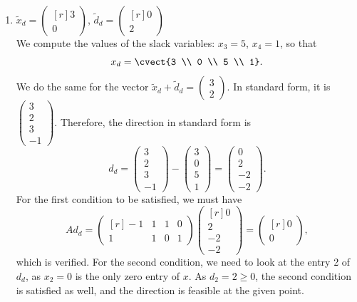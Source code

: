 \begin{enumerate}
%
%
        \item $\tilde{x}_d = \begin{pmatrix*}[r] 3 \\ 0 \end{pmatrix*}$, $\tilde{d}_d = \begin{pmatrix*}[r] 0 \\ 2 \end{pmatrix*}$ \\
        We compute the values of the slack variables: $x_3 = 5$, $x_4
        = 1$, so that
        \[
         {x}_d = \cvect{3 \\ 0 \\ 5 \\ 1}.
         \]
         We do the same for the vector $\tilde{x}_d+\tilde{d}_d =\left(\begin{array}{r} 3\\ 2 \end{array}\right)$.
         In standard form, it is $\left(\begin{array}{r} 3\\ 2 \\ 3 \\ -1 \end{array}\right)$.
         Therefore, the direction in standard form is
         \[d_d=\left(\begin{array}{r} 3\\ 2 \\ 3 \\ -1 \end{array}\right)-
         \left(\begin{array}{r} 3 \\ 0 \\ 5 \\ 1\end{array}\right) =
         \left(\begin{array}{r} 0\\ 2 \\ -2 \\ -2 \end{array}\right).
         \]
        For the first condition to be satisfied, we must have
        \begin{equation*}
        A{d}_d = \begin{pmatrix*}[r] -1 & 1 & 1 & 0 \\ 1 & 1 & 0 & 1 \end{pmatrix*} \begin{pmatrix*}[r] 0 \\ 2 \\ -2 \\ -2 \end{pmatrix*} = \begin{pmatrix*}[r] 0 \\ 0 \end{pmatrix*},
        \end{equation*}
        which is verified.
For the second condition, we need to look at the entry 2 of $d_d$, as
$x_2= 0$ is the only zero entry of $x$. As  $d_2 = 2 \geq 0$, the second condition is satisfied as well, and  the  direction is feasible at the given point.
    \end{enumerate}
    
